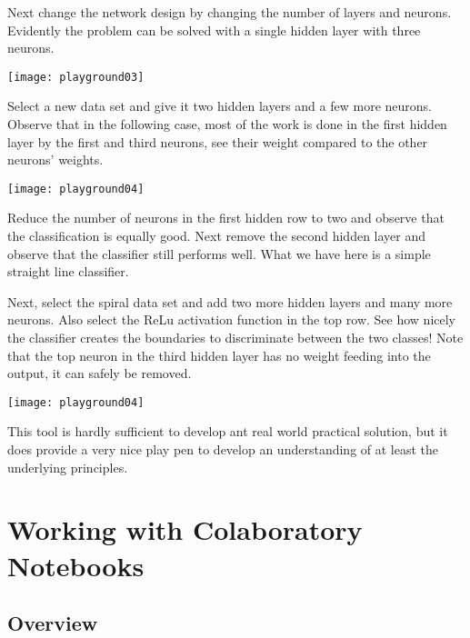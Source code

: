 Next change the network design by changing the number of layers and neurons. Evidently the problem can be solved with a single hidden layer with three neurons.

\begin{figure*}[h]
\texttt{[image: playground03]}
\end{figure*}

\FloatBarrier

Select a new data set and give it two hidden layers and a few more neurons. Observe that in the following case, most of the work is done in the first hidden layer by the first and third neurons, see their weight compared to the other neurons' weights.

\begin{figure*}[h]
\texttt{[image: playground04]}
\end{figure*}

\FloatBarrier

Reduce the number of neurons in the first hidden row to two and observe that the classification is equally good.  Next remove the second hidden layer and observe that the classifier still performs well. What we have here is a simple straight line classifier.

Next, select the spiral data set and add two more hidden layers and many more neurons.  Also select the ReLu activation function in the top row.  See how nicely the classifier creates the boundaries to discriminate between the two classes!  Note that the top neuron in the third hidden layer has no weight feeding into the output, it can safely be removed.

\begin{figure*}[h]
\texttt{[image: playground04]}
\end{figure*}

\FloatBarrier

This tool is hardly sufficient to develop ant real world practical solution, but it does provide a very nice play pen to develop an understanding of at least the underlying principles.



\section{Working with Colaboratory Notebooks}
\subsection{Overview}


